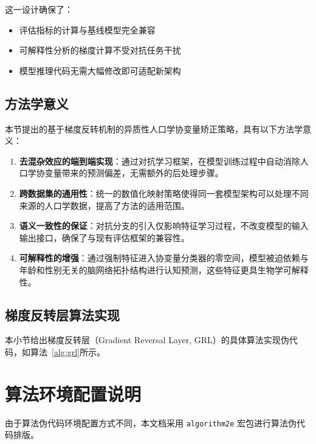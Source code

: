 这一设计确保了：
\begin{itemize}
    \item 评估指标的计算与基线模型完全兼容
    \item 可解释性分析的梯度计算不受对抗任务干扰
    \item 模型推理代码无需大幅修改即可适配新架构
\end{itemize}

\subsection{方法学意义}

本节提出的基于梯度反转机制的异质性人口学协变量矫正策略，具有以下方法学意义：

\begin{enumerate}
    \item \textbf{去混杂效应的端到端实现}：通过对抗学习框架，在模型训练过程中自动消除人口学协变量带来的预测偏差，无需额外的后处理步骤。

    \item \textbf{跨数据集的通用性}：统一的数值化映射策略使得同一套模型架构可以处理不同来源的人口学数据，提高了方法的适用范围。

    \item \textbf{语义一致性的保证}：对抗分支的引入仅影响特征学习过程，不改变模型的输入输出接口，确保了与现有评估框架的兼容性。

    \item \textbf{可解释性的增强}：通过强制特征进入协变量分类器的零空间，模型被迫依赖与年龄和性别无关的脑网络拓扑结构进行认知预测，这些特征更具生物学可解释性。
\end{enumerate}

\subsection{梯度反转层算法实现}

本小节给出梯度反转层（Gradient Reversal Layer, GRL）的具体算法实现伪代码，如算法~\ref{alg:grl}所示。

\section*{算法环境配置说明}
由于算法伪代码环境配置方式不同，本文档采用 \texttt{algorithm2e} 宏包进行算法伪代码排版。

